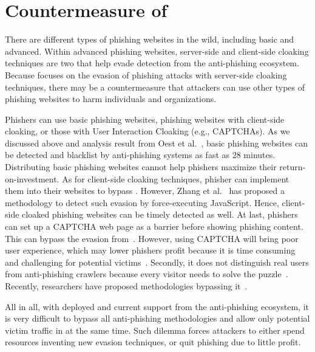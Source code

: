 \section{Countermeasure of \spartacus}


There are different types of phishing websites in the wild, including basic and advanced.
Within advanced phishing websites, server-side and client-side cloaking techniques are two that help evade detection from the anti-phishing ecosystem.
Because \spartacus focuses on the evasion of phishing attacks with server-side cloaking techniques,
there may be a countermeasure that attackers can use other types of phishing websites to harm individuals and organizations.

Phishers can use basic phishing websites, phishing websites with client-side cloaking, or those with User Interaction Cloaking (e.g., CAPTCHAs).
As we discussed above and analysis result from Oest et al.~\cite{oest2020phishtime}, basic phishing websites can be detected and blacklist by anti-phishing systems as fast as 28 minutes.
Distributing basic phishing websites cannot help phishers maximize their return-on-investment.
As for client-side cloaking techniques,
phisher can implement them into their websites to bypass \spartacus.
However, Zhang et al.~\cite{zhang2021crawlphish} has proposed a methodology to detect such evasion by force-executing JavaScript.
Hence, client-side cloaked phishing websites can be timely detected as well.
At last, phishers can set up a CAPTCHA web page as a barrier before showing phishing content.
This can bypass the evasion from~\spartacus.
However, using CAPTCHA will bring poor user experience, which may lower phishers profit because it is time consuming and challenging for potential victims~\cite{captcha}.
Secondly, it does not distinguish real users from anti-phishing crawlers because every visitor needs to solve the puzzle~\cite{captcha}.
Recently, researchers have proposed methodologies bypassing it~\cite{sivakorn2016m,stark2015captcha, zhang2021crawlphish}.


All in all, with \spartacus deployed and current support from the anti-phishing ecosystem, 
it is very difficult to bypass all anti-phishing methodologies and allow only potential victim traffic in at the same time.
Such dilemma forces attackers to either spend resources inventing new evasion techniques, or quit phishing due to little profit.


